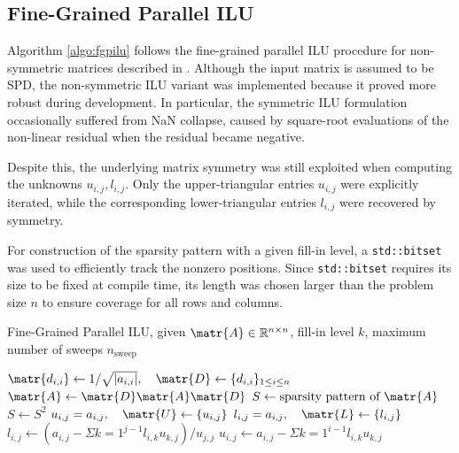 \subsection{Fine-Grained Parallel ILU}
\label{sec:fine-grain-parall-1}

Algorithm \ref{algo:fgpilu} follows the fine-grained parallel ILU procedure for
non-symmetric matrices described in \cite{chow_fine-grained_2015}. Although the
input matrix is assumed to be SPD, the non-symmetric ILU variant was implemented
because it proved more robust during development. In particular, the symmetric
ILU formulation occasionally suffered from NaN collapse, caused by square-root
evaluations of the non-linear residual when the residual became negative.

Despite this, the underlying matrix symmetry was still exploited when computing
the unknowns \(u_{i,j}, l_{i,j}\). Only the upper-triangular entries \(u_{i,j}\)
were explicitly iterated, while the corresponding lower-triangular entries
\(l_{i,j}\) were recovered by symmetry.

For construction of the sparsity pattern with a given fill-in level, a
\texttt{std::bitset} was used to efficiently track the nonzero positions. Since
\texttt{std::bitset} requires its size to be fixed at compile time, its length was
chosen larger than the problem size \(n\) to ensure coverage for all rows and
columns.

\begin{singlespace}
  \begin{algorithm}[h]
    \caption{Fine-Grained Parallel ILU, given \(\matr{A} \in \mathbb{R}^{n \times n}\), fill-in
      level \(k\), maximum number of sweeps \(n_{\text{sweep}}\)}
    \label{algo:fgpilu}
    \begin{algorithmic}[1]
      \State \(\matr{d_{i,i}} \gets 1 / \sqrt{|a_{i,i}|},\quad \matr{D} \gets \{d_{i,i}\}_{1
        \le i \le n}\) 
      \State \(\matr{A} \gets \matr{D} \matr{A} \matr{D}\)
      \State \(S \gets \text{sparsity pattern of } \matr{A}\)
        \State \(S \gets S^2\) 
      \EndFor
      \State \(u_{i,j} = a_{i, j},\quad \matr{U} \gets \{u_{i,j}\}\) 
      \State \(l_{i,j} = a_{i, j},\quad \matr{L} \gets \{l_{i,j}\}\)
            \State \(l_{i,j} \gets (a_{i,j} - \Sigma{k=1}^{j-1} l_{i,k}u_{k,j}) / u_{j,j}\)
          \Else
            \State \(u_{i,j} \gets a_{i,j} - \Sigma{k=1}^{i-1} l_{i,k}u_{k,j}\)
          \EndIf
        \EndFor
      \EndFor
    \end{algorithmic}
  \end{algorithm}
\end{singlespace}

